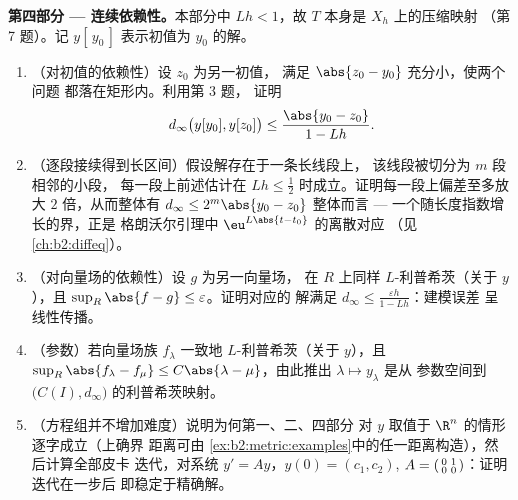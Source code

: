 \begin{problem}
\medskip
\noindent\textbf{第四部分 --- 连续依赖性。}本部分中
        $Lh < 1$，故 $T$ 本身是 $X_h$ 上的压缩映射
        （第 7 题）。记 $y[\,y_0\,]$ 表示初值为
        $y_0$ 的解。
\begin{enumerate}[resume]
  \item （对初值的依赖性）设 $z_0$ 为另一初值，
        满足 $\abs{z_0 - y_0}$ 充分小，使两个问题
        都落在矩形内。利用第 3 题，
        证明
        \[
        d_\infty\bigl(y[y_0], y[z_0]\bigr) \leq
        \frac{\abs{y_0 - z_0}}{1 - Lh}.
        \]
  \item （逐段接续得到长区间）假设解存在于一条长线段上，
        该线段被切分为 $m$ 段相邻的小段，
        每一段上前述估计在 $Lh \leq
        \frac12$ 时成立。证明每一段上偏差至多放大
        $2$ 倍，从而整体有 $d_\infty \leq 2^m\abs{y_0 - z_0}$
        整体而言 --- 一个随长度指数增长的界，正是
        格朗沃尔引理中 $\eu^{L\abs{t - t_0}}$ 的离散对应
        （见\cref{ch:b2:diffeq}）。
  \item （对向量场的依赖性）设 $g$ 为另一向量场，
        在 $R$ 上同样 $L$-利普希茨（关于 $y$），且 $\sup_R \abs{f - g}
        \leq \varepsilon$。证明对应的
        解满足 $d_\infty \leq
        \frac{\varepsilon h}{1 - Lh}$：建模误差
        呈线性传播。
  \item （参数）若向量场族 $f_\lambda$
        一致地 $L$-利普希茨（关于 $y$），且 $\sup_R\abs{f_\lambda
        - f_\mu} \leq C\abs{\lambda - \mu}$，由此推出
        $\lambda \mapsto y_\lambda$ 是从
        参数空间到 $\bigl(C(I), d_\infty\bigr)$ 的利普希茨映射。
  \item （方程组并不增加难度）说明为何第一、二、四部分
        对 $y$ 取值于 $\R^n$ 的情形逐字成立（上确界
        距离可由
        \cref{ex:b2:metric:examples}中的任一距离构造），然后计算全部皮卡
        迭代，对系统 $y' = Ay$，$y(0) = (c_1,
        c_2)$, $A = \begin{psmallmatrix} 0 & 1\\ 0 &
        0\end{psmallmatrix}$：证明迭代在一步后
        即稳定于精确解。
\end{enumerate}


\end{problem}
